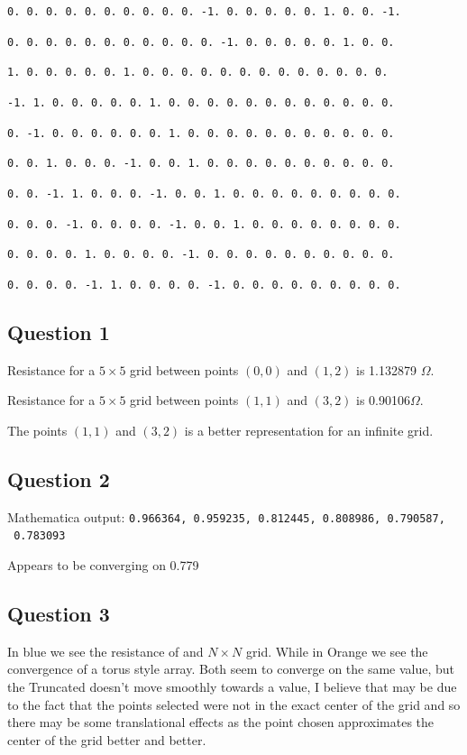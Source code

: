 \documentclass{article}
\begin{document}
 \texttt{0.  0.  0.  0.  0.  0.  0.  0.  0.  0. -1.  0.  0.  0.  0.  0.  1.  0.  0. -1.}

 \texttt{0.  0.  0.  0.  0.  0.  0.  0.  0.  0.  0. -1.  0.  0.  0.  0.  0.  1.  0.  0.}

 \texttt{1.  0.  0.  0.  0.  0.  1.  0.  0.  0.  0.  0.  0.  0.  0.  0.  0.  0.  0.  0.}

\texttt{-1.  1.  0.  0.  0.  0.  0.  1.  0.  0.  0.  0.  0.  0.  0.  0.  0.  0.  0.  0.}

 \texttt{0. -1.  0.  0.  0.  0.  0.  0.  1.  0.  0.  0.  0.  0.  0.  0.  0.  0.  0.  0.}

 \texttt{0.  0.  1.  0.  0.  0. -1.  0.  0.  1.  0.  0.  0.  0.  0.  0.  0.  0.  0.  0.}

 \texttt{0.  0. -1.  1.  0.  0.  0. -1.  0.  0.  1.  0.  0.  0.  0.  0.  0.  0.  0.  0.}

 \texttt{0.  0.  0. -1.  0.  0.  0.  0. -1.  0.  0.  1.  0.  0.  0.  0.  0.  0.  0.  0.}

 \texttt{0.  0.  0.  0.  1.  0.  0.  0.  0. -1.  0.  0.  0.  0.  0.  0.  0.  0.  0.  0.}

 \texttt{0.  0.  0.  0. -1.  1.  0.  0.  0.  0. -1.  0.  0.  0.  0.  0.  0.  0.  0.  0.}

\subsection{Question 1}

Resistance for a $5 \times 5$ grid between points  $(0,0)$ and  $(1,2)$ is 1.132879 $\Omega$.

Resistance for a $5 \times 5$ grid between points  $(1,1)$ and  $(3,2)$ is 0.90106$\Omega$.

The points $ (1,1) $ and $(3,2)$ is a better representation for an infinite grid.

\subsection{Question 2}

Mathematica output: \texttt{{{0.966364}, {0.959235}, {0.812445}, {0.808986}, {0.790587}, \
{0.783093}}}

Appears to be converging on 0.779

\subsection{Question 3}

In blue we see the resistance of and $N \times N$ grid. While in Orange we see the convergence of a torus style array. Both seem to converge on the same value, but the Truncated doesn't move smoothly towards a value, I believe that may be due to the fact that the points selected were not in the exact center of the grid and so there may be some translational effects as the point chosen approximates the center of the grid better and better.
\end{document}
